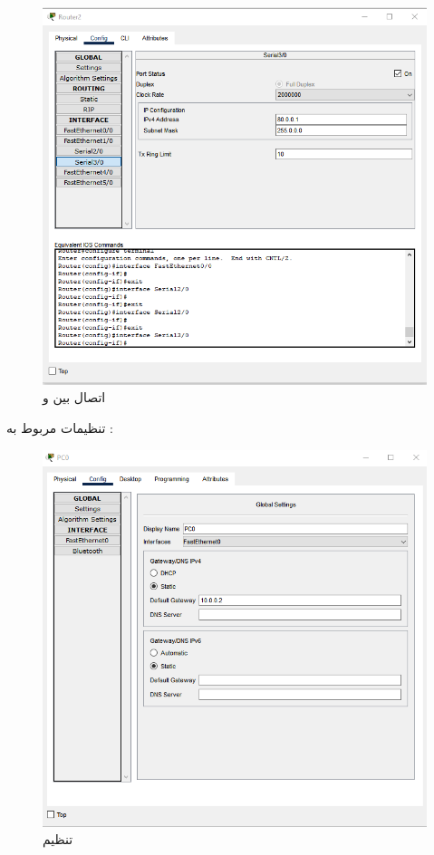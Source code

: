 \documentclass[12pt]{article}
\begin{document}
\begin{figure}[H]
	\centering
	\includegraphics[scale=0.4]{images/rip/3.png}
	\caption{اتصال بین  و } 
	\label{r2r0}
\end{figure}

تنظیمات مربوط به :


\begin{figure}[H]
	\centering
	\includegraphics[scale=0.4]{images/rip/5.png}
	\caption{تنظیم } 
	\label{defaultgatewayconfig}
\end{figure}
\end{document}
